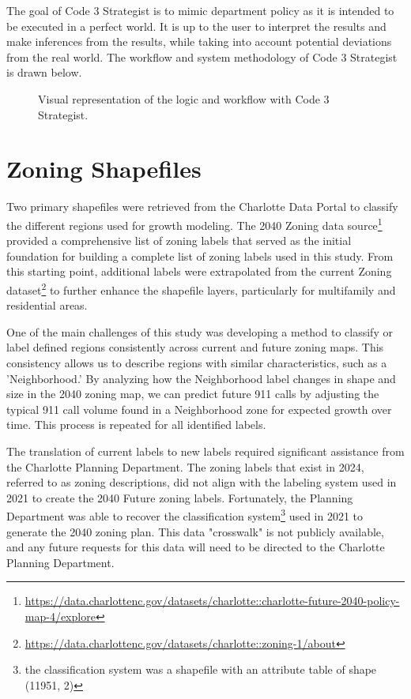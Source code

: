 The goal of Code 3 Strategist is to mimic department policy as it is intended to be executed in a perfect world. It is up to the user to interpret the results and make inferences from the results, while taking into account potential deviations from the real world. The workflow and system methodology of Code 3 Strategist is drawn below.

\begin{figure}[H]
    \centering
    \caption{Visual representation of the logic and workflow with Code 3 Strategist.}
    \label{fig:C3SWorkflow}  
\end{figure}

\section{Zoning Shapefiles}
Two primary shapefiles were retrieved from the Charlotte Data Portal\citep{charlotte_data_portal} to classify the different regions used for growth modeling. The 2040 Zoning data source\footnote[1]{\url{https://data.charlottenc.gov/datasets/charlotte::charlotte-future-2040-policy-map-4/explore}} provided a comprehensive list of zoning labels that served as the initial foundation for building a complete list of zoning labels used in this study. From this starting point, additional labels were extrapolated from the current Zoning dataset\footnote[1]{\url{https://data.charlottenc.gov/datasets/charlotte::zoning-1/about}} to further enhance the shapefile layers, particularly for multifamily and residential areas. 

One of the main challenges of this study was developing a method to classify or label defined regions consistently across current and future zoning maps. This consistency allows us to describe regions with similar characteristics, such as a 'Neighborhood.' By analyzing how the Neighborhood label changes in shape and size in the 2040 zoning map, we can predict future 911 calls by adjusting the typical 911 call volume found in a Neighborhood zone for expected growth over time. This process is repeated for all identified labels.

The translation of current labels\cite{charlotte2024useregulations} to new labels required significant assistance from the Charlotte Planning Department. The zoning labels that exist in 2024, referred to as zoning descriptions, did not align with the labeling system used in 2021 to create the 2040 Future zoning labels. Fortunately, the Planning Department was able to recover the classification system\footnote[1]{the classification system was a shapefile with an attribute table of shape (11951, 2)} used in 2021 to generate the 2040 zoning plan. This data "crosswalk" is not publicly available, and any future requests for this data will need to be directed to the Charlotte Planning Department.

